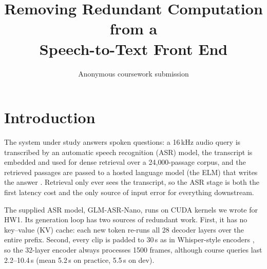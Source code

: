 \documentclass{article}
\title{Removing Redundant Computation from a\\Speech-to-Text Front End}
\author{Anonymous coursework submission}
\begin{document}
\maketitle


%

\section{Introduction}
\label{sec:introduction}

The system under study answers spoken questions: a 16\,kHz audio query is
transcribed by an automatic speech recognition (ASR) model, the transcript is
embedded and used for dense retrieval over a 24{,}000-passage corpus, and the
retrieved passages are passed to a hosted language model (the ELM) that writes the
answer \citep{lewis2020rag}. Retrieval only ever sees the transcript, so the ASR
stage is both the first latency cost and the only source of input error for
everything downstream.

The supplied ASR model, GLM-ASR-Nano, runs on CUDA kernels we wrote for HW1. Its
generation loop has two sources of redundant work. First, it has no key--value
(KV) cache: each new token re-runs all 28 decoder layers over the entire prefix.
Second, every clip is padded to 30\,s as in Whisper-style encoders
\citep{radford2023whisper}, so the 32-layer encoder always processes 1500 frames,
although course queries last 2.2--10.4\,s (mean 5.2\,s on practice, 5.5\,s on dev).
\end{document}
